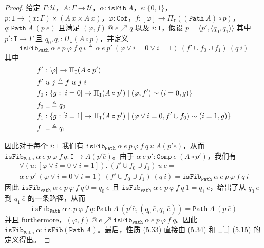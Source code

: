 \documentclass{ctexrep}
\theoremstyle{plain}
\theoremstyle{definition}
\theoremstyle{remark}
\newcommand{\ul}{{\rule[0ex]{0.5em}{0.4pt}}} %
\begin{document}
\begin{proof}
给定 $\Gamma : \mathcal{U}$，$A : \Gamma \to \mathcal{U}$，$\alpha : \mathtt{isFib}\ A$，$e : \{0,1\}$，$p : \mathtt{I} \to (x : \Gamma) \times (A\ x \times A\ x)$，$\varphi : \mathtt{Cof}$，$f : [\varphi] \to \Pi_{\mathtt{I}}((\mathtt{Path}\ A) \circ p)$，$q : \mathtt{Path}\ A\ (p\ e)$ 且满足 $(\varphi, f)\ @\ e \nearrow q$ 以及 $i : \mathtt{I}$，假设 $p = \langle p', \langle q_0, q_1\rangle\rangle$ 其中 $p' : \mathtt{I} \to \Gamma$ 且 $q_0, q_1 : \Pi_{\mathtt{I}}(A \circ p)$，并定义
\begin{equation}
\mathtt{isFib}_{\mathtt{Path}}\ \alpha\ e\ p\ \varphi\ f\ q\ i \triangleq \alpha\ e\ p'\ (\varphi \lor i = 0 \lor i = 1)\ (f' \cup f_0 \cup f_1)\ (q\ i)
\end{equation}
其中
\begin{align*}
&f' : [\varphi] \to \Pi_{\mathtt{I}}(A \circ p') \\
&f'\ u\ j \triangleq f\ u\ j\ i \\
&f_0 : \{g : [i = 0] \to \Pi_{\mathtt{I}}(A \circ p') \mid (\varphi, f') \sim (i = 0, g)\} \\
&f_0\ \ul  \triangleq q_0 \\
&f_1 : \{g : [i = 1] \to \Pi_{\mathtt{I}}(A \circ p') \mid (\varphi \lor i = 0, f' \cup f_0) \sim (i = 1, g)\} \\
&f_1\ \ul  \triangleq q_1
\end{align*}

因此对于每个 $i : \mathtt{I}$ 我们有 $\mathtt{isFib}_{\mathtt{Path}}\ \alpha\ e\ p\ \varphi\ f\ q\ i : A(p'\bar{e})$，从而 $\mathtt{isFib}_{\mathtt{Path}}\ \alpha\ e\ p\ \varphi\ f\ q : \mathtt{I} \to A(p'\bar{e})$。由于 $\alpha\ e\ p' : \mathtt{Comp}\ e\ (A \circ p')$，我们有
\begin{align*}
\forall(u : [\varphi \lor i = 0 \lor i = 1]).\ (f' \cup f_0 \cup f_1)\ u\ \bar{e} = \\
\alpha\ e\ p'\ (\varphi \lor i = 0 \lor i = 1)\ (f' \cup f_0 \cup f_1)\ (q\ i) = \mathtt{isFib}_{\mathtt{Path}}\ \alpha\ e\ p\ \varphi\ f\ q\ i
\end{align*}
因此 $\mathtt{isFib}_{\mathtt{Path}}\ \alpha\ e\ p\ \varphi\ f\ q\ 0 = q_0\ \bar{e}$ 且 $\mathtt{isFib}_{\mathtt{Path}}\ \alpha\ e\ p\ \varphi\ f\ q\ 1 = q_1\ \bar{e}$，给出了从 $q_0\ \bar{e}$ 到 $q_1\ \bar{e}$ 的一条路径，从而
\[
\mathtt{isFib}_{\mathtt{Path}}\ \alpha\ e\ p\ \varphi\ f\ q : \mathtt{Path}\ A\ (p'\bar{e}, (q_0\ \bar{e}, q_1\ \bar{e})) = \mathtt{Path}\ A\ (p\ \bar{e})
\]
并且 furthermore，$(\varphi, f)\ @\ \bar{e} \nearrow \mathtt{isFib}_{\mathtt{Path}}\ \alpha\ e\ p\ \varphi\ f\ q$。因此 $\mathtt{isFib}_{\mathtt{Path}}\ \alpha : \mathtt{isFib}(\mathtt{Path}\ A)$。最后，性质 (5.33) 直接由 (5.34) 和 $\ul [\ul ]$ (5.15) 的定义得出。
\end{proof}
\end{document}
